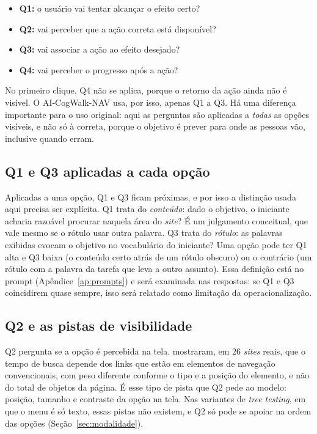 \documentclass[12pt,oneside,a4paper,chapter=TITLE,english,brazil]{abntex2}
\newcommand{\proj}{AI-CogWalk-NAV}
\begin{document}
\begin{itemize}
\item \textbf{Q1:} o usuário vai tentar alcançar o efeito certo?
\item \textbf{Q2:} vai perceber que a ação correta está disponível?
\item \textbf{Q3:} vai associar a ação ao efeito desejado?
\item \textbf{Q4:} vai perceber o progresso após a ação?
\end{itemize}

No primeiro clique, Q4 não se aplica, porque o retorno da ação ainda não é visível. O \proj{} usa, por isso, apenas Q1 a Q3. Há uma diferença importante para o uso original: aqui as perguntas são aplicadas a \emph{todas} as opções visíveis, e não só à correta, porque o objetivo é prever para onde as pessoas vão, inclusive quando erram.

\subsection{Q1 e Q3 aplicadas a cada opção}

Aplicadas a uma opção, Q1 e Q3 ficam próximas, e por isso a distinção usada aqui precisa ser explícita. Q1 trata do \emph{conteúdo}: dado o objetivo, o iniciante acharia razoável procurar naquela área do \textit{site}? É um julgamento conceitual, que vale mesmo se o rótulo usar outra palavra. Q3 trata do \emph{rótulo}: as palavras exibidas evocam o objetivo no vocabulário do iniciante? Uma opção pode ter Q1 alta e Q3 baixa (o conteúdo certo atrás de um rótulo obscuro) ou o contrário (um rótulo com a palavra da tarefa que leva a outro assunto). Essa definição está no prompt (Apêndice~\ref{ap:prompts}) e será examinada nas respostas: se Q1 e Q3 coincidirem quase sempre, isso será relatado como limitação da operacionalização.

\subsection{Q2 e as pistas de visibilidade}

Q2 pergunta se a opção é percebida na tela.  mostraram, em 26 \textit{sites} reais, que o tempo de busca depende dos links que estão em elementos de navegação convencionais, com peso diferente conforme o tipo e a posição do elemento, e não do total de objetos da página. É esse tipo de pista que Q2 pede ao modelo: posição, tamanho e contraste da opção na tela. Nas variantes de \textit{tree testing}, em que o menu é só texto, essas pistas não existem, e Q2 só pode se apoiar na ordem das opções (Seção~\ref{sec:modalidade}).
\end{document}

